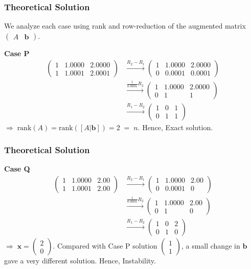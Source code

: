 \documentclass{beamer}
\theoremstyle{remark}
\newcommand{\myvec}[1]{\ensuremath{\begin{pmatrix}#1\end{pmatrix}}}
\let\vec\mathbf
\numberwithin{equation}{section}
\begin{document}
\begin{frame}
\frametitle{Theoretical Solution}
We analyze each case using rank and row-reduction of the augmented matrix 
$\myvec{A & \vec{b}}$.

\textbf{Case P}
\begin{align}
\myvec{1 & 1.0000 & 2.0000 \\ 1 & 1.0001 & 2.0001}
&\xrightarrow{R_2 - R_1}
\myvec{1 & 1.0000 & 2.0000 \\ 0 & 0.0001 & 0.0001} \\
&\xrightarrow{\tfrac{1}{0.0001}R_2}
\myvec{1 & 1.0000 & 2.0000 \\ 0 & 1 & 1} \\
&\xrightarrow{R_1 - R_2}
\myvec{1 & 0 & 1 \\ 0 & 1 & 1}
\end{align}
$\Rightarrow \; \text{rank}(A)=\text{rank}([A|\vec{b}])=2 \;=\; n$.  
Hence, Exact solution.

\end{frame}

\begin{frame}
\frametitle{Theoretical Solution}
\textbf{Case Q}
\begin{align}
\myvec{1 & 1.0000 & 2.00 \\ 1 & 1.0001 & 2.00}
&\xrightarrow{R_2 - R_1}
\myvec{1 & 1.0000 & 2.00 \\ 0 & 0.0001 & 0} \\
&\xrightarrow{\tfrac{1}{0.0001}R_2}
\myvec{1 & 1.0000 & 2.00 \\ 0 & 1 & 0} \\
&\xrightarrow{R_1 - R_2}
\myvec{1 & 0 & 2 \\ 0 & 1 & 0}
\end{align}
$\Rightarrow \; \vec{x}=\myvec{2 \\ 0}$.  
Compared with Case P solution $\myvec{1 \\ 1}$, a small change in $\vec{b}$ gave a very different solution.  
Hence, Instability.

\end{frame}
\end{document}
